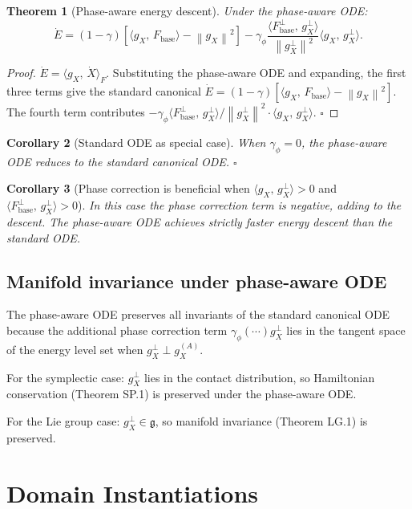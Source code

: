 \documentclass[11pt,a4paper]{article}
\newtheorem{theorem}{Theorem}[section]
\newtheorem{corollary}[theorem]{Corollary}
\theoremstyle{definition}
\newcommand{\norm}[1]{\left\|#1\right\|}
\newcommand{\inner}[2]{\langle #1,\,#2\rangle}
\newcommand{\Fbase}{F_{\mathrm{base}}}
\newcommand{\gX}{g_X}
\begin{document}
\begin{theorem}[Phase-aware energy descent]
Under the phase-aware ODE:
\[
\dot E = (1-\gamma)\left[\inner{\gX}{\Fbase} - \norm{\gX}^2\right]
- \gamma_\phi\frac{\inner{\Fbase^\perp}{\gX^\perp}}{\norm{\gX^\perp}^2}\inner{\gX}{\gX^\perp}.
\]
\end{theorem}

\begin{proof}
$\dot E = \inner{\gX}{\dot X}_F$. Substituting the phase-aware ODE and expanding,
the first three terms give the standard canonical $\dot E = (1-\gamma)[\inner{\gX}{\Fbase} - \norm{\gX}^2]$.
The fourth term contributes $-\gamma_\phi\inner{\Fbase^\perp}{\gX^\perp}/\norm{\gX^\perp}^2 \cdot\inner{\gX}{\gX^\perp}$.
$\square$
\end{proof}

\begin{corollary}[Standard ODE as special case]
When $\gamma_\phi = 0$, the phase-aware ODE reduces to the standard canonical ODE. $\square$
\end{corollary}

\begin{corollary}[Phase correction is beneficial when $\inner{\gX}{\gX^\perp} > 0$ and
$\inner{\Fbase^\perp}{\gX^\perp} > 0$]
In this case the phase correction term is negative, adding to the descent.
The phase-aware ODE achieves strictly faster energy descent than the standard ODE.
\end{corollary}

\subsection{Manifold invariance under phase-aware ODE}

The phase-aware ODE preserves all invariants of the standard canonical ODE
because the additional phase correction term $\gamma_\phi(\cdots)\gX^\perp$ lies in the
tangent space of the energy level set when $\gX^\perp \perp \gX^{(A)}$.

For the symplectic case: $\gX^\perp$ lies in the contact distribution,
so Hamiltonian conservation (Theorem SP.1) is preserved under the phase-aware ODE.

For the Lie group case: $\gX^\perp \in \mathfrak{g}$, so manifold invariance (Theorem LG.1)
is preserved.

\section{Domain Instantiations}
\end{document}
